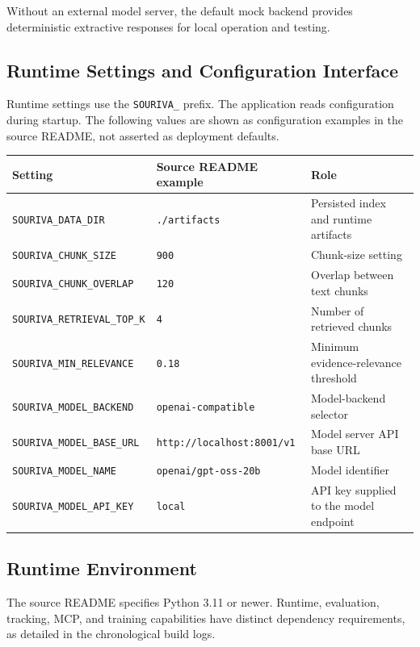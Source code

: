 Without an external model server, the default mock backend provides deterministic extractive responses for local operation and testing.

\subsection{Runtime Settings and Configuration Interface}

Runtime settings use the \texttt{SOURIVA\_} prefix. The application reads configuration during startup. The following values are shown as configuration examples in the source README, not asserted as deployment defaults.

\begingroup
\small
\setlength{\tabcolsep}{3pt}
\begin{longtable}[]{@{}p{2.25in}p{1.55in}p{2.30in}@{}}
\toprule\noalign{}
Setting & Source README example & Role \\
\midrule\noalign{}
\endhead
\bottomrule\noalign{}
\endlastfoot
\texttt{SOURIVA\_DATA\_DIR} & \texttt{./artifacts} & Persisted index and runtime artifacts \\
\texttt{SOURIVA\_CHUNK\_SIZE} & \texttt{900} & Chunk-size setting \\
\texttt{SOURIVA\_CHUNK\_OVERLAP} & \texttt{120} & Overlap between text chunks \\
\texttt{SOURIVA\_RETRIEVAL\_TOP\_K} & \texttt{4} & Number of retrieved chunks \\
\texttt{SOURIVA\_MIN\_RELEVANCE} & \texttt{0.18} & Minimum evidence-relevance threshold \\
\texttt{SOURIVA\_MODEL\_BACKEND} & \texttt{openai-compatible} & Model-backend selector \\
\texttt{SOURIVA\_MODEL\_BASE\_URL} & \texttt{http://localhost:}\newline\texttt{8001/v1} & Model server API base URL \\
\texttt{SOURIVA\_MODEL\_NAME} & \texttt{openai/gpt-oss-20b} & Model identifier \\
\texttt{SOURIVA\_MODEL\_API\_KEY} & \texttt{local} & API key supplied to the model endpoint \\
\end{longtable}
\endgroup

\subsection{Runtime Environment}

The source README specifies Python 3.11 or newer. Runtime, evaluation, tracking, MCP, and training capabilities have distinct dependency requirements, as detailed in the chronological build logs.


